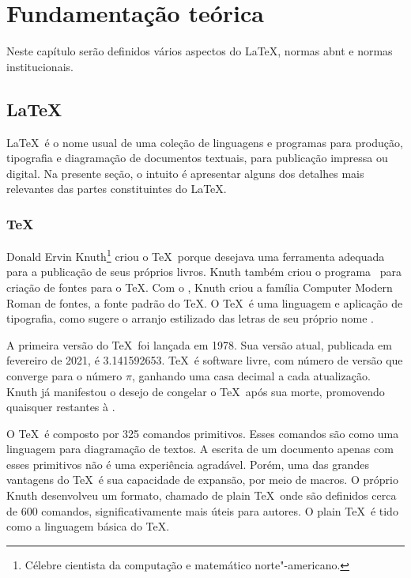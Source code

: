 \chapter{Fundamentação teórica}

Neste capítulo serão definidos vários aspectos do \LaTeX, normas \ac{abnt} e normas institucionais.

\section{\LaTeX}

\LaTeX\ é o nome usual de uma coleção de linguagens e programas para produção, tipografia e diagramação de documentos textuais, para publicação impressa ou digital. Na presente seção, o intuito é apresentar alguns dos detalhes mais relevantes das partes constituintes do \LaTeX.

\subsection{\TeX}

Donald Ervin Knuth\footnote{Célebre cientista da computação e matemático norte"-americano.} criou o \TeX\ porque desejava uma ferramenta adequada para a publicação de seus próprios livros. Knuth também criou o programa \MF\ para criação de fontes para o \TeX. Com o \MF, Knuth criou a família Computer Modern Roman de fontes, a fonte padrão do \TeX. O \TeX\ é uma linguagem e aplicação de tipografia, como sugere o arranjo estilizado das letras de seu próprio nome \cites{Knuth1986a,Knuth1986b,Knuth1986c,Knuth1986d,Knuth1986e}.

A primeira versão do \TeX\ foi lançada em 1978. Sua versão atual, publicada em fevereiro de 2021, é 3.141592653. \TeX\ é software livre, com número de versão que converge para o número \(\pi\), ganhando uma casa decimal a cada atualização. Knuth já manifestou o desejo de congelar o \TeX\ após sua morte, promovendo quaisquer  restantes à .

O \TeX\ é composto por 325 comandos primitivos. Esses comandos são como uma linguagem  para diagramação de textos. A escrita de um documento apenas com esses primitivos não é uma experiência agradável. Porém, uma das grandes vantagens do \TeX\ é sua capacidade de expansão, por meio de macros. O próprio Knuth desenvolveu um formato, chamado de plain \TeX\, onde são definidos cerca de 600 comandos, significativamente mais úteis para autores. O plain \TeX\ é tido como a linguagem básica do \TeX.

